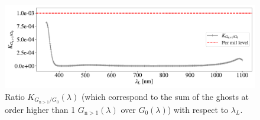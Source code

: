 \begin{figure}[h]
    \centering
    \includegraphics[width=\columnwidth]{fig/ratio_g1_ginf.pdf}
    \caption{Ratio $K_{G_{\mathrm{n}>1}/G_0}(\lambda)$ (which correspond to the sum of the ghosts at order higher than 1 $G_{\mathrm{n}>1}(\lambda)$ over $G_0(\lambda)$) with respect to $\lambda_L$.}
    \label{fig:ratio_ginf_g0}
\end{figure}


